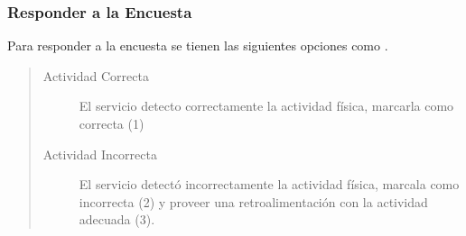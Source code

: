 {\begin{quote}
\begin{description}
\end{description}
\end{quote}

\subsubsection{Responder a la Encuesta}
\label{contrib:responder-a-la-encuesta}
Para responder a la encuesta se tienen las siguientes opciones como .
\begin{quote}
\begin{description}
\item[{Actividad Correcta}] \leavevmode
El servicio detecto correctamente la actividad física, marcarla como correcta (1)

\item[{Actividad Incorrecta}] \leavevmode
El servicio detectó incorrectamente la actividad física, marcala como incorrecta (2)
y proveer una retroalimentación con la actividad adecuada (3).

\end{description}
\end{quote}

}
